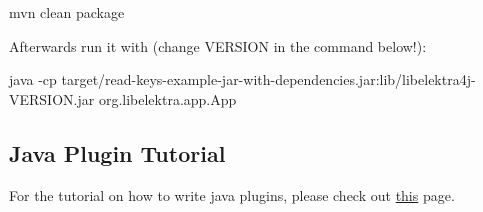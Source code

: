 \begin{DoxyCode}
mvn clean package
\end{DoxyCode}


Afterwards run it with (change V\+E\+R\+S\+I\+ON in the command below!)\+:


\begin{DoxyCode}
java -cp target/read-keys-example-jar-with-dependencies.jar:lib/libelektra4j-VERSION.jar
       org.libelektra.app.App
\end{DoxyCode}


\subsection*{Java Plugin Tutorial}

For the tutorial on how to write java plugins, please check out \hyperlink{doc_tutorials_java-plugins_md}{this} page. 